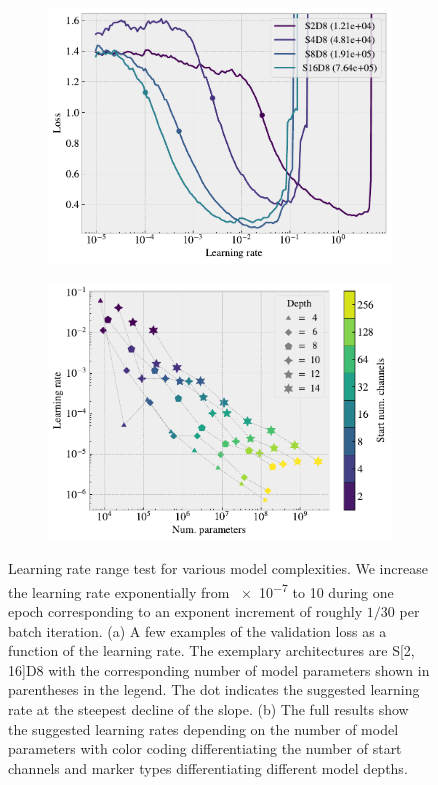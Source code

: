 \begin{figure}[!htb]
  \centering
  \begin{subfigure}[t]{0.49\textwidth}
      \centering
      \includegraphics[width=\textwidth]{figures/ML/LR_range_specific.pdf}
      \caption{}
  \end{subfigure}
  \hfill
  \begin{subfigure}[t]{0.49\textwidth}
      \centering
      \includegraphics[width=\textwidth]{figures/ML/LR_range_full.pdf}
      \caption{}
  \end{subfigure}
  \hfill
  \caption{Learning rate range test for various model complexities. We increase the learning rate exponentially from \num{e-7} to 10 during one epoch corresponding to an exponent increment of roughly $1/30$ per batch iteration. (a) A few examples of the validation loss as a function of the learning rate. The exemplary architectures are S[2, 16]D8 with the corresponding number of model parameters shown in parentheses in the legend. The dot indicates the suggested learning rate at the steepest decline of the slope. (b) The full results show the suggested learning rates depending on the number of model parameters with color coding differentiating the number of start channels and marker types differentiating different model depths. }
  \label{fig:LR_range}
\end{figure}


